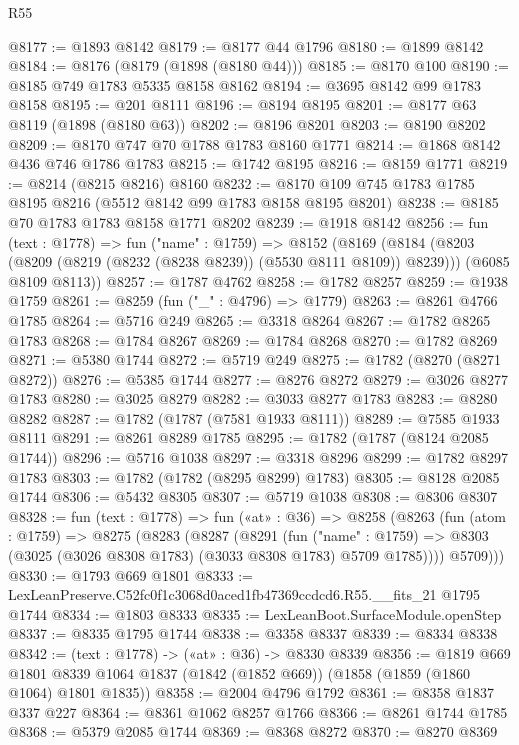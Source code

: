 \begin{lexlean}{R55}
\begin{coremodule}
@8177 := @1893 @8142
@8179 := @8177 @44 @1796
@8180 := @1899 @8142
@8184 := @8176 (@8179 (@1898 (@8180 @44)))
@8185 := @8170 @100
@8190 := @8185 @749 @1783 @5335 @8158 @8162
@8194 := @3695 @8142 @99 @1783 @8158
@8195 := @201 @8111
@8196 := @8194 @8195
@8201 := @8177 @63 @8119 (@1898 (@8180 @63))
@8202 := @8196 @8201
@8203 := @8190 @8202
@8209 := @8170 @747 @70 @1788 @1783 @8160 @1771
@8214 := @1868 @8142 @436 @746 @1786 @1783
@8215 := @1742 @8195
@8216 := @8159 @1771
@8219 := @8214 (@8215 @8216) @8160
@8232 := @8170 @109 @745 @1783 @1785 @8195 @8216 (@5512 @8142 @99 @1783 @8158 @8195 @8201)
@8238 := @8185 @70 @1783 @1783 @8158 @1771 @8202
@8239 := @1918 @8142
@8256 := fun (text : @1778) =>
  fun ("name" : @1759) =>
  @8152
    (@8169
      (@8184 (@8203 (@8209 (@8219 (@8232 (@8238 @8239)) (@5530 @8111 @8109)) @8239)))
      (@6085 @8109 @8113))
@8257 := @1787 @4762
@8258 := @1782 @8257
@8259 := @1938 @1759
@8261 := @8259 (fun ("_" : @4796) => @1779)
@8263 := @8261 @4766 @1785
@8264 := @5716 @249
@8265 := @3318 @8264
@8267 := @1782 @8265 @1783
@8268 := @1784 @8267
@8269 := @1784 @8268
@8270 := @1782 @8269
@8271 := @5380 @1744
@8272 := @5719 @249
@8275 := @1782 (@8270 (@8271 @8272))
@8276 := @5385 @1744
@8277 := @8276 @8272
@8279 := @3026 @8277 @1783
@8280 := @3025 @8279
@8282 := @3033 @8277 @1783
@8283 := @8280 @8282
@8287 := @1782 (@1787 (@7581 @1933 @8111))
@8289 := @7585 @1933 @8111
@8291 := @8261 @8289 @1785
@8295 := @1782 (@1787 (@8124 @2085 @1744))
@8296 := @5716 @1038
@8297 := @3318 @8296
@8299 := @1782 @8297 @1783
@8303 := @1782 (@1782 (@8295 @8299) @1783)
@8305 := @8128 @2085 @1744
@8306 := @5432 @8305
@8307 := @5719 @1038
@8308 := @8306 @8307
@8328 := fun (text : @1778) =>
  fun («at» : @36) =>
  @8258
    (@8263
      (fun (atom : @1759) =>
      @8275
        (@8283
          (@8287
            (@8291
              (fun ("name" : @1759) =>
              @8303 (@3025 (@3026 @8308 @1783) (@3033 @8308 @1783) @5709 @1785))))
          @5709)))
@8330 := @1793 @669 @1801
@8333 := LexLeanPreserve.C52fc0f1c3068d0aced1fb47369ccdcd6.R55.__fits_21 @1795 @1744
@8334 := @1803 @8333
@8335 := LexLeanBoot.SurfaceModule.openStep
@8337 := @8335 @1795 @1744
@8338 := @3358 @8337
@8339 := @8334 @8338
@8342 := (text : @1778) -> («at» : @36) -> @8330 @8339
@8356 := @1819
    @669
    @1801
    @8339
    @1064
    @1837
    (@1842 (@1852 @669))
    (@1858 (@1859 (@1860 @1064) @1801 @1835))
@8358 := @2004 @4796 @1792
@8361 := @8358 @1837 @337 @227
@8364 := @8361 @1062 @8257 @1766
@8366 := @8261 @1744 @1785
@8368 := @5379 @2085 @1744
@8369 := @8368 @8272
@8370 := @8270 @8369

\end{coremodule}
\end{lexlean}
